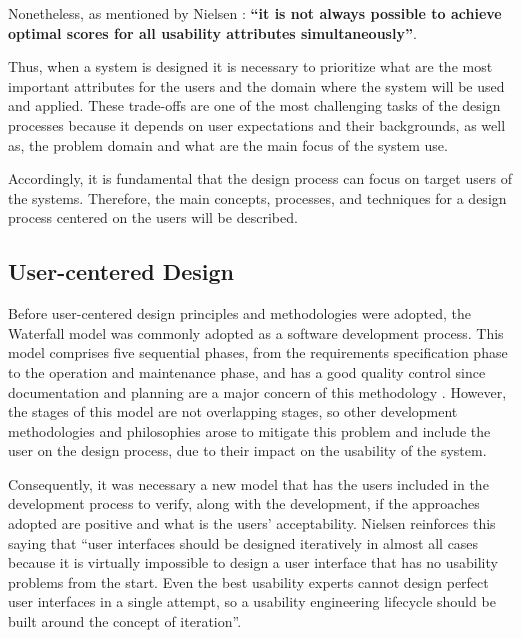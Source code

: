 Nonetheless, as mentioned by Nielsen \cite{usabilityEngineering}: \textbf{“it is not always possible to achieve optimal scores for all usability attributes simultaneously”}.


Thus, when a system is designed it is necessary to prioritize what are the most important attributes for the users and the domain where the system will be used and applied. These trade-offs are one of the most challenging tasks of the design processes because it depends on user expectations and their backgrounds, as well as, the problem domain and what are the main focus of the system use.

Accordingly, it is fundamental that the design process can focus on target users of the systems. Therefore, the main concepts, processes, and techniques for a design process centered on the users will be described.

\subsection{User-centered Design}
\label{subsec:user_centered_design}
Before user-centered design principles and methodologies were adopted, the Waterfall model was commonly adopted as a software development process. This model comprises five sequential phases, from the requirements specification phase to the operation and maintenance phase, and has a good quality control since documentation and planning are a major concern of this methodology \cite{aComparisonBetweenThreeSDLCModelsWatterfallSpiralIncrementalIterative}. However, the stages of this model are not overlapping stages, so other development methodologies and philosophies arose to mitigate this problem and include the user on the design process, due to their impact on the usability of the system.

Consequently, it was necessary a new model that has the users included in the development process to verify, along with the development, if the approaches adopted are positive and what is the users' acceptability. Nielsen \cite{iterativeUserInterfaceDesign} reinforces this saying that “user interfaces should be designed iteratively in almost all cases because it is virtually impossible to design a user interface that has no usability problems from the start. Even the best usability experts cannot design perfect user interfaces in a single attempt, so a usability engineering lifecycle should be built around the concept of iteration”.

